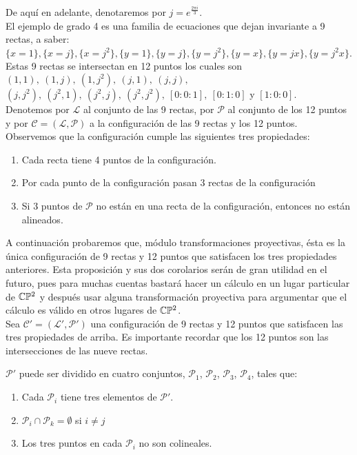 De aquí en adelante, denotaremos por $j=e^{\frac{2\pi i}{3}}$.
\\


El ejemplo de grado 4 es una familia de ecuaciones que dejan invariante a 9 rectas, a saber: $\{x=1\}, \{x=j\}, \{x=j^{2}\}, \{y=1\}, \{y=j\}, \{y=j^{2}\}, \{y=x\}, \{y=jx\}, \{y=j^{2}x\}$.
\\

Estas 9 rectas se intersectan en 12 puntos los cuales son $(1,1),\ (1,j),\ (1,j^{2}),\ (j,1),\ (j,j),$\\ $(j,j^{2}),\ (j^{2},1),\ (j^{2},j),\ (j^{2},j^{2}),\ [0:0:1],\ [0:1:0]$ y $[1:0:0]$.
\\

Denotemos por $\mathcal{L}$ al conjunto de las 9 rectas, por $\mathcal{P}$ al conjunto de los 12 puntos y por $\mathcal{C=(L,P)}$ a la configuración de las 9 rectas y los 12 puntos.
\\

Observemos que la configuración cumple las siguientes tres propiedades:

\begin{enumerate}

\item Cada recta tiene 4 puntos de la configuración.
\item Por cada punto de la configuración pasan 3 rectas de la configuración
\item Si 3 puntos de $\mathcal{P}$ no están en una recta de la configuración, entonces no están alineados.

\end{enumerate} 

A continuación probaremos que, módulo transformaciones proyectivas, ésta es la única configuración de 9 rectas y 12 puntos que satisfacen los tres propiedades anteriores. Esta proposición y sus dos corolarios serán de gran utilidad en el futuro, pues para muchas cuentas bastará hacer un cálculo en un lugar particular de $\mathbb{C}\mathbb{P}^2$ y después usar alguna transformación proyectiva para argumentar que el cálculo es válido en otros lugares de $\mathbb{C}\mathbb{P}^2$.
\\

Sea $\mathcal{C'=(L',P')}$ una configuración de 9 rectas y 12 puntos que satisfacen las tres propiedades de arriba. Es importante recordar que los 12 puntos son las intersecciones de las nueve rectas.

\begin{Lema}
\label{Lema:Conf}
$\mathcal{P'}$ puede ser dividido en cuatro conjuntos, $\mathcal{P}_{1}$, $\mathcal{P}_{2}$, $\mathcal{P}_{3}$, $\mathcal{P}_{4}$, tales que:

\begin{enumerate}

\item Cada $\mathcal{P}_{i}$ tiene tres elementos de $\mathcal{P'}$.
\item $\mathcal{P}_{i} \cap \mathcal{P}_{k} = \emptyset$ si $i \neq j$
\item Los tres puntos en cada $\mathcal{P}_{i}$ no son colineales.

\end{enumerate}

\end{Lema}

